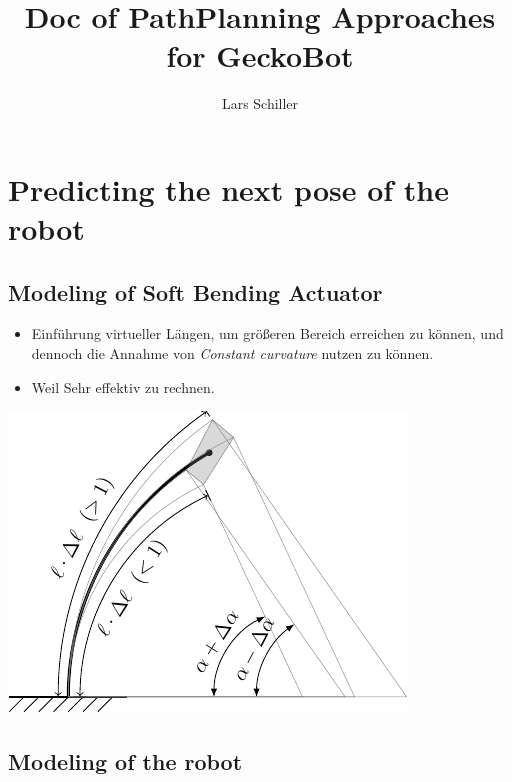 \documentclass[10pt,a4paper]{article}
\author{Lars Schiller}
\begin{document}
\title{Doc of PathPlanning Approaches for GeckoBot}

\maketitle
\tableofcontents

\section{Predicting the next pose of the robot}
\subsection{Modeling of Soft Bending Actuator}

\begin{itemize}
	\item Einführung virtueller Längen, um größeren Bereich erreichen zu können, und dennoch die Annahme von \textsl{Constant curvature} nutzen zu können.
	\item Weil Sehr effektiv zu rechnen.
\end{itemize}

\includegraphics[scale=1]{pics/Virtual_length/virtual_length.pdf}



\subsection{Modeling of the robot}
\end{document}
